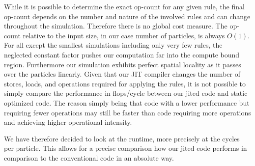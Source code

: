 While it is possible to determine the exact op-count for any given rule, the final op-count depends on the number and nature of the involved rules and can change throughout the simulation.
Therefore there is no global cost measure.
The op-count relative to the input size, in our case number of particles, is always $O(1)$.
For all except the smallest simulations including only very few rules, the neglected constant factor pushes our computation far into the compute bound region.
Furthermore our simulation exhibits perfect spatial locality as it passes over the particles linearly.
Given that our JIT compiler changes the number of stores, loads, and operations required for applying the rules, it is not possible to simply compare the performance in flops/cycle between our jited code and static optimized code.
The reason simply being that code with a lower performance but requiring fewer operations may still be faster than code requiring more operations and achieving higher operational intensity.

We have therefore decided to look at the runtime, more precisely at the cycles per particle. This allows for a precise comparison how our jited code performs in comparison to the conventional code in an absolute way.

